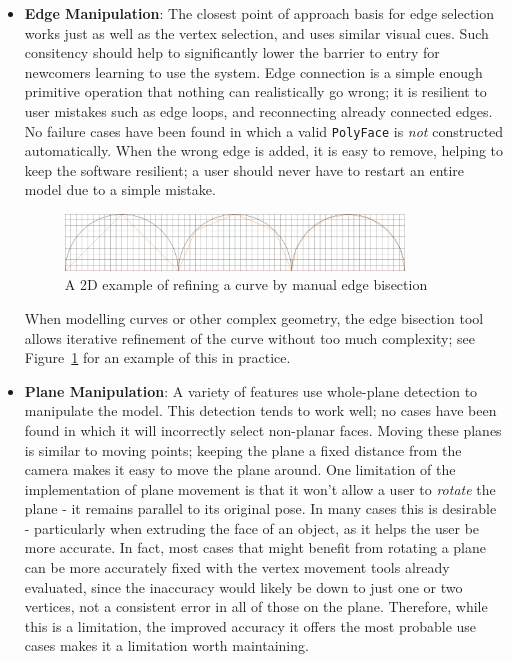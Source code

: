 \documentclass[a4paper,10pt]{report}
\begin{document}
\begin{itemize}
\item{\textbf{Edge Manipulation}: The closest point of approach basis for edge selection works just as well as the vertex selection, and uses similar visual cues. Such consitency should help to significantly lower the barrier to entry for newcomers learning to use the system. Edge connection is a simple enough primitive operation that nothing can realistically go wrong; it is resilient to user mistakes such as edge loops, and reconnecting already connected edges. No failure cases have been found in which a valid \texttt{PolyFace} is \textit{not} constructed automatically. When the wrong edge is added, it is easy to remove, helping to keep the software resilient; a user should never have to restart an entire model due to a simple mistake.

\begin{figure}
  \begin{center}
    \includegraphics[width=340px]{EdgeRefinement}
  \end{center}
  \caption{A 2D example of refining a curve by manual edge bisection}
  \label{refine}
\end{figure} 

When modelling curves or other complex geometry, the edge bisection tool allows iterative refinement of the curve without too much complexity; see Figure~\ref{refine} for an example of this in practice.}

\item{\textbf{Plane Manipulation}: A variety of features use whole-plane detection to manipulate the model. This detection tends to work well; no cases have been found in which it will incorrectly select non-planar faces. Moving these planes is similar to moving points; keeping the plane a fixed distance from the camera makes it easy to move the plane around. One limitation of the implementation of plane movement is that it won't allow a user to \textit{rotate} the plane - it remains parallel to its original pose. In many cases this is desirable - particularly when extruding the face of an object, as it helps the user be more accurate. In fact, most cases that might benefit from rotating a plane can be more accurately fixed with the vertex movement tools already evaluated, since the inaccuracy would likely be down to just one or two vertices, not a consistent error in all of those on the plane. Therefore, while this is a limitation, the improved accuracy it offers the most probable use cases makes it a limitation worth maintaining.

}
\end{itemize}
\end{document}
